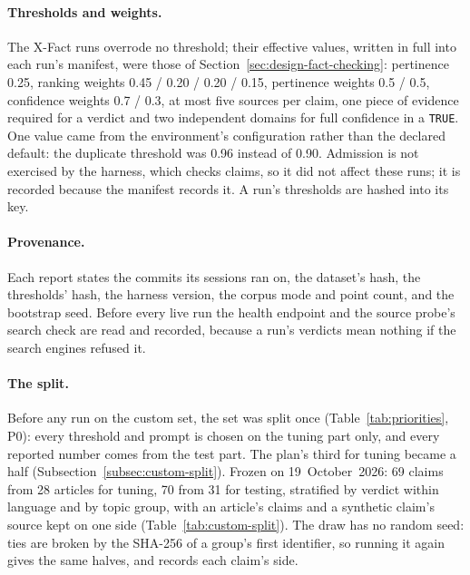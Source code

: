 \paragraph{Thresholds and weights.} The X-Fact runs overrode no
threshold; their effective values, written in full into each run's
manifest, were those of Section~\ref{sec:design-fact-checking}:
pertinence 0.25, ranking weights 0.45 / 0.20 / 0.20 / 0.15, pertinence
weights 0.5 / 0.5, confidence weights 0.7 / 0.3, at most five sources
per claim, one piece of evidence required for a verdict and two
independent domains for full confidence in a \texttt{TRUE}. One value
came from the environment's configuration rather than the declared
default: the duplicate threshold was 0.96 instead of 0.90. Admission is
not exercised by the harness, which checks claims, so it did not affect
these runs; it is recorded because the manifest records it. A run's
thresholds are hashed into its key.

\paragraph{Provenance.} Each report states the commits its sessions
ran on, the dataset's hash, the thresholds' hash, the harness version,
the corpus mode and point count, and the bootstrap seed. Before every
live run the health endpoint and the source probe's search check are
read and recorded, because a run's verdicts mean nothing if the search
engines refused it.

\paragraph{The split.} Before any run on the custom set, the set was
split once (Table~\ref{tab:priorities}, P0): every threshold and prompt
is chosen on the tuning part only, and every reported number comes from
the test part. The plan's third for tuning became a half
(Subsection~\ref{subsec:custom-split}). Frozen on 19~October~2026:
69 claims from 28 articles for tuning, 70 from 31 for testing,
stratified by verdict within language and by topic group, with an
article's claims and a synthetic claim's source kept on one side
(Table~\ref{tab:custom-split}). The draw has no random seed: ties are
broken by the SHA-256 of a group's first identifier, so running it again
gives the same halves, and 
records each claim's side.
